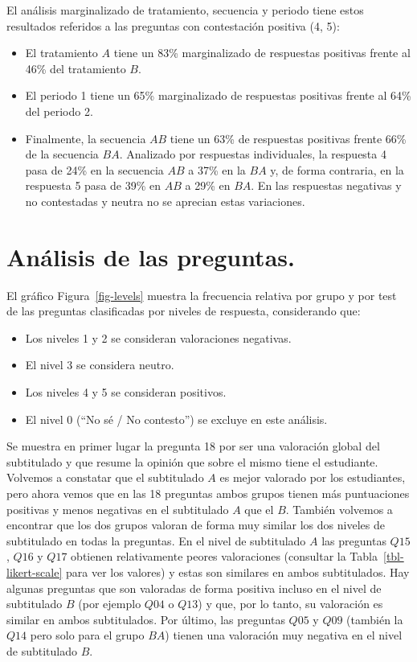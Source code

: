 \documentclass[
  12pt,
  a4paper,
  extrafontsizes,
  onecolumn,
  openright]{memoir}
\providecommand{\tightlist}{%
  \setlength{\itemsep}{0pt}\setlength{\parskip}{0pt}}\usepackage{longtable,booktabs,array}
\begin{document}
El análisis marginalizado de tratamiento, secuencia y periodo tiene
estos resultados referidos a las preguntas con contestación positiva (4,
5):

\begin{itemize}
\item
  El tratamiento \(A\) tiene un 83\% marginalizado de respuestas
  positivas frente al 46\% del tratamiento \(B\).
\item
  El periodo 1 tiene un 65\% marginalizado de respuestas positivas
  frente al 64\% del periodo 2.
\item
  Finalmente, la secuencia \(AB\) tiene un 63\% de respuestas positivas
  frente 66\% de la secuencia \(BA\). Analizado por respuestas
  individuales, la respuesta 4 pasa de 24\% en la secuencia \(AB\) a
  37\% en la \(BA\) y, de forma contraria, en la respuesta 5 pasa de
  39\% en \(AB\) a 29\% en \(BA\). En las respuestas negativas y no
  contestadas y neutra no se aprecian estas variaciones.
\end{itemize}

\hypertarget{anuxe1lisis-de-las-preguntas.}{%
\section{Análisis de las
preguntas.}\label{anuxe1lisis-de-las-preguntas.}}

El gráfico Figura~\ref{fig-levels} muestra la frecuencia relativa por
grupo y por test de las preguntas clasificadas por niveles de respuesta,
considerando que:

\begin{itemize}
\tightlist
\item
  Los niveles 1 y 2 se consideran valoraciones negativas.
\item
  El nivel 3 se considera neutro.
\item
  Los niveles 4 y 5 se consideran positivos.
\item
  El nivel 0 (\enquote{No sé / No contesto}) se excluye en este
  análisis.
\end{itemize}

Se muestra en primer lugar la pregunta 18 por ser una valoración global
del subtitulado y que resume la opinión que sobre el mismo tiene el
estudiante. Volvemos a constatar que el subtitulado \(A\) es mejor
valorado por los estudiantes, pero ahora vemos que en las 18 preguntas
ambos grupos tienen más puntuaciones positivas y menos negativas en el
subtitulado \(A\) que el \(B\). También volvemos a encontrar que los dos
grupos valoran de forma muy similar los dos niveles de subtitulado en
todas la preguntas. En el nivel de subtitulado \(A\) las preguntas
\(Q15\), \(Q16\) y \(Q17\) obtienen relativamente peores valoraciones
(consultar la Tabla~\ref{tbl-likert-scale} para ver los valores) y estas
son similares en ambos subtitulados. Hay algunas preguntas que son
valoradas de forma positiva incluso en el nivel de subtitulado \(B\)
(por ejemplo \(Q04\) o \(Q13\)) y que, por lo tanto, su valoración es
similar en ambos subtitulados. Por último, las preguntas \(Q05\) y
\(Q09\) (también la \(Q14\) pero solo para el grupo \(BA\)) tienen una
valoración muy negativa en el nivel de subtitulado \(B\).
\end{document}
